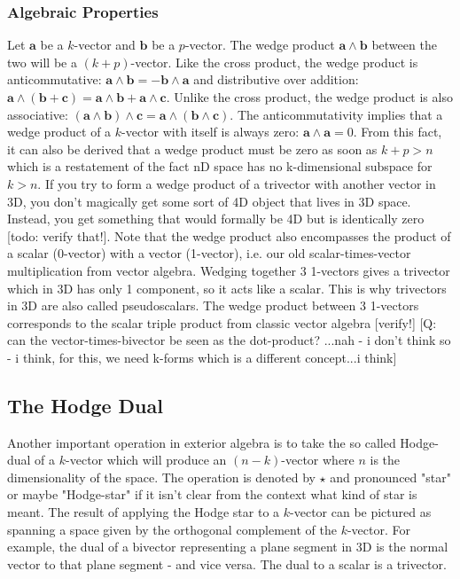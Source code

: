 \subsubsection{Algebraic Properties}
Let $\mathbf{a}$ be a $k$-vector and $\mathbf{b}$ be a $p$-vector. The wedge product $\mathbf{a \wedge b}$ between the two will be a $(k+p)$-vector. Like the cross product, the wedge product is anticommutative: $\mathbf{a \wedge b} = -\mathbf{b \wedge a}$ and distributive over addition: $\mathbf{a \wedge (b + c) = a \wedge b + a \wedge c }$. Unlike the cross product, the wedge product is also associative: $\mathbf{(a \wedge b) \wedge c = a \wedge (b \wedge c)}$. The anticommutativity implies that a wedge product of a $k$-vector with itself is always zero: $\mathbf{a \wedge a} = 0$. From this fact, it can also be derived that a wedge product must be zero as soon as $k+p > n$ which is a restatement of the fact nD space has no k-dimensional subspace for $k>n$. If you try to form a wedge product of a trivector with another vector in 3D, you don't magically get some sort of 4D object that lives in 3D space. Instead, you get something that would formally be 4D but is identically zero [todo: verify that!]. Note that the wedge product also encompasses the product of a scalar (0-vector) with a vector (1-vector), i.e. our old scalar-times-vector multiplication from vector algebra. Wedging together 3 1-vectors gives a trivector which in 3D has only 1 component, so it acts like a scalar. This is why trivectors in 3D are also called pseudoscalars. The wedge product between 3 1-vectors corresponds to the scalar triple product from classic vector algebra [verify!] [Q: can the vector-times-bivector be seen as the dot-product? ...nah - i don't think so - i think, for this, we need k-forms which is a different concept...i think]


\subsection{The Hodge Dual}
Another important operation in exterior algebra is to take the so called Hodge-dual of a $k$-vector which will produce an $(n-k)$-vector where $n$ is the dimensionality of the space. The operation is denoted by $\star$ and pronounced "star" or maybe "Hodge-star" if it isn't clear from the context what kind of star is meant. The result of applying the Hodge star to a $k$-vector can be pictured as spanning a space given by the orthogonal complement of the $k$-vector. For example, the dual of a bivector representing a plane segment in 3D is the normal vector to that plane segment - and vice versa. The dual to a scalar is a trivector.

